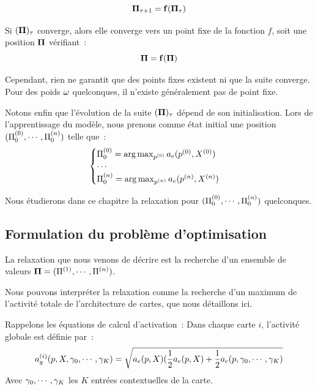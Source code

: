 \documentclass[../main]{subfiles}
\begin{document}
\begin{equation}
\mathbf{\Pi}_{\tau+1} = \mathbf{f}(\mathbf{\Pi}_\tau)
\end{equation}

Si $(\mathbf{\Pi})_\tau$ converge, alors elle converge vers un point fixe de la fonction $f$, soit une position $\mathbf{\Pi}$ vérifiant~:
\begin{equation}
\mathbf{\Pi} = \mathbf{f}(\mathbf{\Pi})
\label{eq:suite}
\end{equation}

Cependant, rien ne garantit que des points fixes existent ni que la suite converge.
Pour des poids $\omega$ quelconques, il n'existe généralement pas de point fixe.

Notons enfin que l'évolution de la suite $(\mathbf{\Pi})_{\tau}$ dépend de son initialisation.
Lors de l'apprentissage du modèle, nous prenons comme état initial une position $(\Pi^{({0})}_0, \cdots , \Pi^{({n})}_0)$  telle que~: 
\begin{equation}
\begin{cases}
\Pi^{({0})}_0 = \operatorname*{arg\,max}_{p^{({0})}} a_e(p^{({0})},X^{({0})})\\
\cdots \\
\Pi^{({n})}_0 = \operatorname*{arg\,max}_{p^{({n})}} a_e(p^{({n})},X^{({n})})\\
\end{cases}
\label{eq:init}
\end{equation}

Nous étudierons dans ce chapitre la relaxation pour $(\Pi^{({0})}_0, \cdots , \Pi^{({n})}_0)$ quelconques.

\subsection{Formulation du problème d'optimisation}

La relaxation que nous venons de décrire est la recherche d'un ensemble de valeurs $\mathbf{\Pi} = (\Pi^{({1})}, \cdots, \Pi^{({n})})$.

Nous pouvons interpréter la relaxation comme la recherche d'un maximum de l'activité totale de l'architecture de cartes, que nous détaillons ici. 

Rappelons les équations de calcul d'activation~:
Dans chaque carte $i$, l'activité globale est définie par~:
\begin{equation}\label{eq:ag}
	a_g^{({i})}(p, X, \gamma_0, \cdots, \gamma_K) = \sqrt{a_e(p,X)(\frac{1}{2}a_e(p,X) + \frac{1}{2}a_c(p,\gamma_0, \cdots, \gamma_K)}
\end{equation}
Avec $\gamma_0, \cdots, \gamma_K$ les $K$ entrées contextuelles de la carte. 
\end{document}
